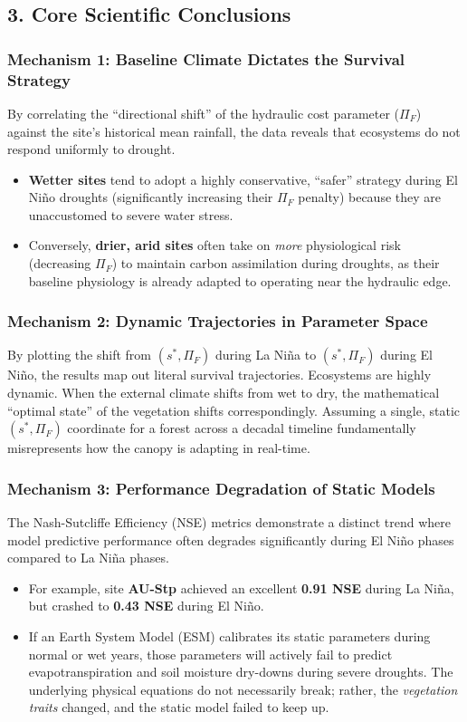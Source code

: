 \subsection*{3. Core Scientific Conclusions}

\subsubsection*{Mechanism 1: Baseline Climate Dictates the Survival Strategy}
By correlating the ``directional shift'' of the hydraulic cost parameter ($\Pi_F$) against the site's historical mean rainfall, the data reveals that ecosystems do not respond uniformly to drought. 
\begin{itemize}
    \item \textbf{Wetter sites} tend to adopt a highly conservative, ``safer'' strategy during El Ni\~no droughts (significantly increasing their $\Pi_F$ penalty) because they are unaccustomed to severe water stress. 
    \item Conversely, \textbf{drier, arid sites} often take on \textit{more} physiological risk (decreasing $\Pi_F$) to maintain carbon assimilation during droughts, as their baseline physiology is already adapted to operating near the hydraulic edge.
\end{itemize}

\subsubsection*{Mechanism 2: Dynamic Trajectories in Parameter Space}
By plotting the shift from $(s^*, \Pi_F)$ during La Ni\~na to $(s^*, \Pi_F)$ during El Ni\~no, the results map out literal survival trajectories. 
Ecosystems are highly dynamic. When the external climate shifts from wet to dry, the mathematical ``optimal state'' of the vegetation shifts correspondingly. Assuming a single, static $(s^*, \Pi_F)$ coordinate for a forest across a decadal timeline fundamentally misrepresents how the canopy is adapting in real-time.

\subsubsection*{Mechanism 3: Performance Degradation of Static Models}
The Nash-Sutcliffe Efficiency (NSE) metrics demonstrate a distinct trend where model predictive performance often degrades significantly during El Ni\~no phases compared to La Ni\~na phases. 
\begin{itemize}
    \item For example, site \textbf{AU-Stp} achieved an excellent \textbf{0.91 NSE} during La Ni\~na, but crashed to \textbf{0.43 NSE} during El Ni\~no. 
    \item If an Earth System Model (ESM) calibrates its static parameters during normal or wet years, those parameters will actively fail to predict evapotranspiration and soil moisture dry-downs during severe droughts. The underlying physical equations do not necessarily break; rather, the \textit{vegetation traits} changed, and the static model failed to keep up.
\end{itemize}

